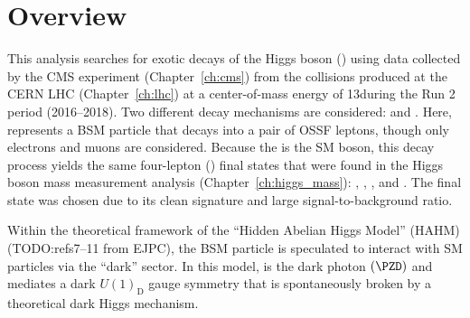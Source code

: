 \section{Overview}
This analysis searches for exotic decays of the Higgs boson (\PH) using data collected by the CMS experiment (Chapter~\ref{ch:cms}) from the \pp collisions produced at the CERN LHC (Chapter~\ref{ch:lhc}) at a center-of-mass energy of 13\TeV during the Run 2 period (2016--2018).
Two different decay mechanisms are considered: \htozx and \htoxx.
Here, \PX represents a BSM particle that decays into a pair of OSSF leptons, though only electrons and muons are considered.
Because the \PZ is the SM \PZ boson, this decay process yields the same four-lepton (\fourl) final states that were found in the Higgs boson mass measurement analysis (Chapter~\ref{ch:higgs_mass}):
\foure, \fourmu, \twoetwomu, and \twomutwoe.
The \fourl final state was chosen due to its clean signature and large signal-to-background ratio.

Within the theoretical framework of the ``Hidden Abelian Higgs Model'' (HAHM) (TODO:refs7--11 from EJPC), the BSM particle \PX is speculated to interact with SM particles via the ``dark'' sector.
In this model, \PX is the dark photon $\left( \PZD \right)$ and mediates a dark $U(1)_\text{D}$ gauge symmetry that is spontaneously broken by a theoretical dark Higgs mechanism.

